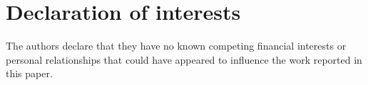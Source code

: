 \documentclass{article}
\begin{document}
\section*{Declaration of interests}

The authors declare that they have no known competing financial interests or personal relationships that could have appeared to influence the work reported in this paper.
\end{document}
